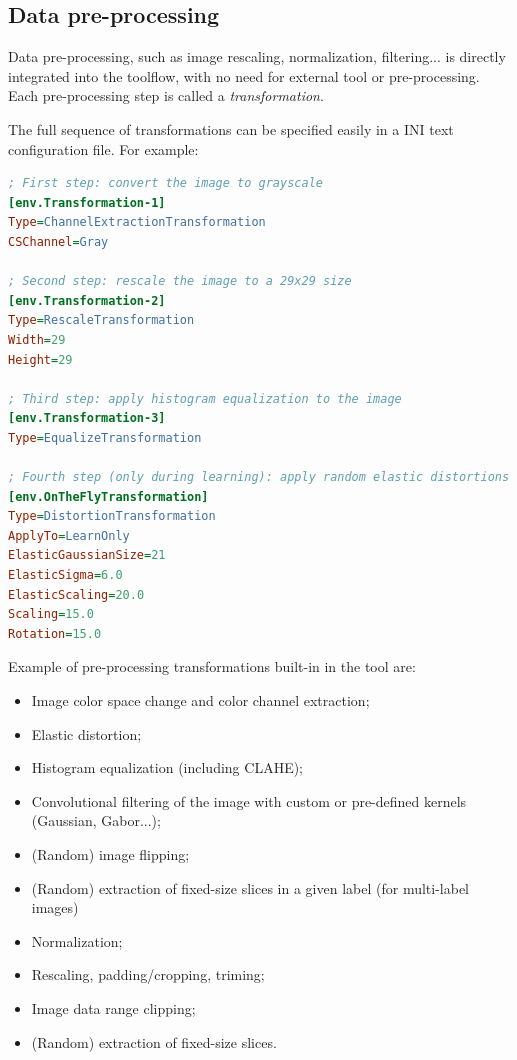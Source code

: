 \documentclass[a4paper,11pt,oneside]{article}
\newenvironment{myitemize}
{ \begin{itemize}
    \setlength{\itemsep}{0pt}
    \setlength{\parskip}{0pt}
    \setlength{\parsep}{0pt}     }
{ \end{itemize}                  }
\begin{document}
\subsection{Data pre-processing}

Data pre-processing, such as image rescaling, normalization, filtering... is
 directly integrated into the toolflow, with no need for external tool or
  pre-processing.
Each pre-processing step is called a \emph{transformation}.

The full sequence of transformations can be specified easily in a INI text
configuration file. For example:
\begin{lstlisting}[language=ini]
; First step: convert the image to grayscale
[env.Transformation-1]
Type=ChannelExtractionTransformation
CSChannel=Gray

; Second step: rescale the image to a 29x29 size
[env.Transformation-2]
Type=RescaleTransformation
Width=29
Height=29

; Third step: apply histogram equalization to the image
[env.Transformation-3]
Type=EqualizeTransformation

; Fourth step (only during learning): apply random elastic distortions to the images to extent the learning set
[env.OnTheFlyTransformation]
Type=DistortionTransformation
ApplyTo=LearnOnly
ElasticGaussianSize=21
ElasticSigma=6.0
ElasticScaling=20.0
Scaling=15.0
Rotation=15.0
\end{lstlisting}

Example of pre-processing transformations built-in in the tool are:
\begin{myitemize}
    \item Image color space change and color channel extraction;
    \item Elastic distortion;
    \item Histogram equalization (including CLAHE);
    \item Convolutional filtering of the image with custom or pre-defined
    kernels (Gaussian, Gabor...);
    \item (Random) image flipping;
    \item (Random) extraction of fixed-size slices in a given label (for
    multi-label images)
    \item Normalization;
    \item Rescaling, padding/cropping, triming;
    \item Image data range clipping;
    \item (Random) extraction of fixed-size slices.
\end{myitemize}
\end{document}
